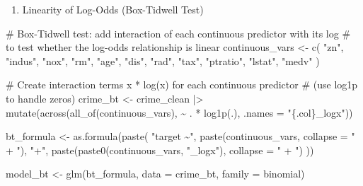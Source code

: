 \documentclass[
  11pt]{article}
\newenvironment{Shaded}{\begin{snugshade}}{\end{snugshade}}
\newcommand{\AttributeTok}[1]{\textcolor[rgb]{0.40,0.45,0.13}{#1}}
\newcommand{\CommentTok}[1]{\textcolor[rgb]{0.37,0.37,0.37}{#1}}
\newcommand{\FunctionTok}[1]{\textcolor[rgb]{0.28,0.35,0.67}{#1}}
\newcommand{\NormalTok}[1]{\textcolor[rgb]{0.00,0.23,0.31}{#1}}
\newcommand{\OtherTok}[1]{\textcolor[rgb]{0.00,0.23,0.31}{#1}}
\newcommand{\SpecialCharTok}[1]{\textcolor[rgb]{0.37,0.37,0.37}{#1}}
\newcommand{\StringTok}[1]{\textcolor[rgb]{0.13,0.47,0.30}{#1}}
\providecommand{\tightlist}{%
  \setlength{\itemsep}{0pt}\setlength{\parskip}{0pt}}
\begin{document}
\begin{enumerate}
\def\labelenumi{\arabic{enumi}.}
\setcounter{enumi}{3}
\tightlist
\item
  Linearity of Log-Odds (Box-Tidwell Test)
\end{enumerate}

\begin{Shaded}
\begin{Highlighting}[]
\CommentTok{\# Box{-}Tidwell test: add interaction of each continuous predictor with its log}
\CommentTok{\# to test whether the log{-}odds relationship is linear}
\NormalTok{continuous\_vars }\OtherTok{\textless{}{-}} \FunctionTok{c}\NormalTok{(}
    \StringTok{"zn"}\NormalTok{, }\StringTok{"indus"}\NormalTok{, }\StringTok{"nox"}\NormalTok{, }\StringTok{"rm"}\NormalTok{, }\StringTok{"age"}\NormalTok{, }\StringTok{"dis"}\NormalTok{, }\StringTok{"rad"}\NormalTok{, }\StringTok{"tax"}\NormalTok{,}
    \StringTok{"ptratio"}\NormalTok{, }\StringTok{"lstat"}\NormalTok{, }\StringTok{"medv"}
\NormalTok{)}

\CommentTok{\# Create interaction terms x * log(x) for each continuous predictor}
\CommentTok{\# (use log1p to handle zeros)}
\NormalTok{crime\_bt }\OtherTok{\textless{}{-}}\NormalTok{ crime\_clean }\SpecialCharTok{|\textgreater{}}
    \FunctionTok{mutate}\NormalTok{(}\FunctionTok{across}\NormalTok{(}\FunctionTok{all\_of}\NormalTok{(continuous\_vars), }\SpecialCharTok{\textasciitilde{}}\NormalTok{ . }\SpecialCharTok{*} \FunctionTok{log1p}\NormalTok{(.), }\AttributeTok{.names =} \StringTok{"\{.col\}\_logx"}\NormalTok{))}

\NormalTok{bt\_formula }\OtherTok{\textless{}{-}} \FunctionTok{as.formula}\NormalTok{(}\FunctionTok{paste}\NormalTok{(}
    \StringTok{"target \textasciitilde{}"}\NormalTok{,}
    \FunctionTok{paste}\NormalTok{(continuous\_vars, }\AttributeTok{collapse =} \StringTok{" + "}\NormalTok{),}
    \StringTok{"+"}\NormalTok{,}
    \FunctionTok{paste}\NormalTok{(}\FunctionTok{paste0}\NormalTok{(continuous\_vars, }\StringTok{"\_logx"}\NormalTok{), }\AttributeTok{collapse =} \StringTok{" + "}\NormalTok{)}
\NormalTok{))}

\NormalTok{model\_bt }\OtherTok{\textless{}{-}} \FunctionTok{glm}\NormalTok{(bt\_formula, }\AttributeTok{data =}\NormalTok{ crime\_bt, }\AttributeTok{family =}\NormalTok{ binomial)}


\end{Highlighting}
\end{Shaded}
\end{document}
